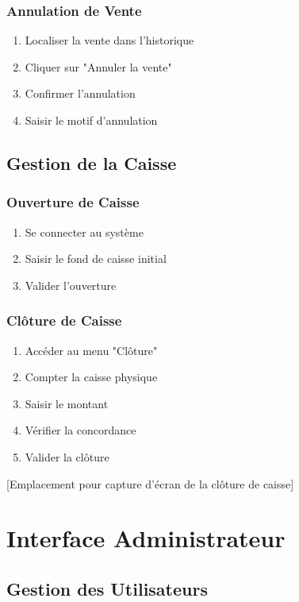\documentclass[14pt,a4paper]{report}
\begin{document}
\subsection{Annulation de Vente}
\begin{enumerate}
    \item Localiser la vente dans l'historique
    \item Cliquer sur "Annuler la vente"
    \item Confirmer l'annulation
    \item Saisir le motif d'annulation
\end{enumerate}

\section{Gestion de la Caisse}
\subsection{Ouverture de Caisse}
\begin{enumerate}
    \item Se connecter au système
    \item Saisir le fond de caisse initial
    \item Valider l'ouverture
\end{enumerate}

\subsection{Clôture de Caisse}
\begin{enumerate}
    \item Accéder au menu "Clôture"
    \item Compter la caisse physique
    \item Saisir le montant
    \item Vérifier la concordance
    \item Valider la clôture
\end{enumerate}

[Emplacement pour capture d'écran de la clôture de caisse]

\chapter{Interface Administrateur}

\section{Gestion des Utilisateurs}
\end{document}
